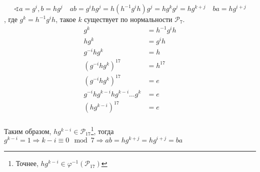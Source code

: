 \begin{solution}
    \[\sphericalangle a = g^i, b = hg^j \quad ab = g^ihg^j = h(h^{-1}g^ih)g^j = hg^kg^j = hg^{k + j} \quad ba = hg^{i + j}\]
    , где \(g^k = h^{-1}g^ih\), такое \(k\) существует по нормальности \(\mathcal{P}_7\).
    \begin{align*}
        g^k                                   & = h^{-1}g^ih \\
        hg^k                                  & = g^ih       \\
        g^{ - i}hg^k                          & = h          \\
        (g^{ - i}hg^k)^{17}                   & = h^{17}     \\
        (g^{ - i}hg^k)^{17}                   & = e          \\
        g^{ - i}hg^{k - i}hg^{k - i}\dots g^k & = e          \\
        (hg^{k - i})^{17}                     & = e          \\
    \end{align*}

    Таким образом, \(hg^{k - i} \in \mathcal{P}_{17}\)\footnote{Точнее, \(hg^{k - i} \in \varphi^{-1}(\mathcal{P}_{17})\)}, тогда \(g^{k - i} = 1 \Rightarrow k - i \equiv 0 \mod 7 \Rightarrow ab = hg^{k + j} = hg^{i + j} = ba\)
\end{solution}



